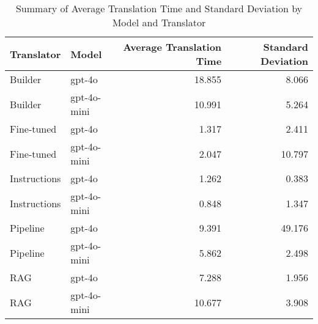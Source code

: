 \begin{table}
\caption{Summary of Average Translation Time and Standard Deviation by Model and Translator}
\label{tab:average_translation_time_summary}
\begin{tabular}{llrr}
\toprule
Translator & Model & Average Translation Time & Standard Deviation \\
\midrule
Builder & gpt-4o & 18.855 & 8.066 \\
Builder & gpt-4o-mini & 10.991 & 5.264 \\
Fine-tuned & gpt-4o & 1.317 & 2.411 \\
Fine-tuned & gpt-4o-mini & 2.047 & 10.797 \\
Instructions & gpt-4o & 1.262 & 0.383 \\
Instructions & gpt-4o-mini & 0.848 & 1.347 \\
Pipeline & gpt-4o & 9.391 & 49.176 \\
Pipeline & gpt-4o-mini & 5.862 & 2.498 \\
RAG & gpt-4o & 7.288 & 1.956 \\
RAG & gpt-4o-mini & 10.677 & 3.908 \\
\bottomrule
\end{tabular}
\end{table}
